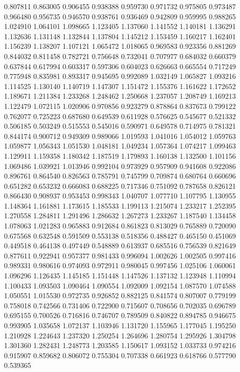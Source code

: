 0.807811
0.863005
0.906455
0.938388
0.959730
0.971732
0.975805
0.973487
0.966480
0.956735
0.946570
0.938761
0.936469
0.942809
0.959995
0.988265
1.024910
1.064101
1.098665
1.123405
1.137060
1.141552
1.140181
1.136291
1.132636
1.131148
1.132844
1.137804
1.145212
1.153459
1.160217
1.162401
1.156239
1.138207
1.107121
1.065472
1.018065
0.969583
0.923356
0.881269
0.844032
0.811458
0.782721
0.756648
0.732041
0.707977
0.684032
0.660379
0.637844
0.617994
0.603317
0.597306
0.604023
0.626663
0.665554
0.717249
0.775948
0.835981
0.893317
0.945695
0.992089
1.032149
1.065827
1.093216
1.114525
1.130140
1.140719
1.147307
1.151472
1.155376
1.161622
1.172652
1.189671
1.211384
1.233268
1.248462
1.250668
1.237057
1.208749
1.169213
1.122479
1.072115
1.020906
0.970856
0.923279
0.878864
0.837673
0.799122
0.762077
0.725223
0.687680
0.649539
0.611928
0.576625
0.545677
0.521332
0.506185
0.503249
0.515553
0.545016
0.590971
0.649578
0.714975
0.781321
0.844174
0.900712
0.949309
0.989066
1.019593
1.041016
1.054012
1.059763
1.059877
1.056343
1.051530
1.048181
1.049234
1.057364
1.074217
1.099463
1.129911
1.159358
1.180342
1.187519
1.179893
1.160138
1.132500
1.101156
1.069486
1.039921
1.013946
0.992104
0.973929
0.957909
0.941608
0.922086
0.896761
0.864540
0.826563
0.785791
0.745799
0.709874
0.680764
0.660696
0.651282
0.653232
0.666083
0.688225
0.717346
0.751092
0.787658
0.826121
0.866430
0.908937
0.953453
0.998343
1.040707
1.077710
1.107795
1.130955
1.148364
1.161881
1.173615
1.185533
1.199113
1.215074
1.233217
1.252395
1.270558
1.284811
1.291496
1.286632
1.267273
1.233267
1.187540
1.134458
1.078063
1.021283
0.965883
0.912684
0.861823
0.813029
0.765889
0.720090
0.675568
0.632548
0.591509
0.553138
0.518356
0.488427
0.465150
0.451069
0.449518
0.464138
0.497449
0.548889
0.613937
0.685516
0.756539
0.821649
0.877611
0.922941
0.957377
0.981433
0.996094
1.002626
1.002505
0.997416
0.989331
0.980616
0.974093
0.972911
0.980045
0.997456
1.025106
1.060061
1.096296
1.126435
1.145185
1.151448
1.147526
1.137132
1.123948
1.110994
1.100433
1.093503
1.090464
1.090554
1.092009
1.092154
1.087570
1.074588
1.050551
1.015530
0.972735
0.926852
0.882125
0.841574
0.807007
0.779199
0.758018
0.742566
0.731406
0.722900
0.715607
0.708656
0.702035
0.696789
0.695155
0.700526
0.716816
0.746707
0.789509
0.840822
0.894785
0.946675
0.993905
1.035658
1.072137
1.103946
1.131720
1.155965
1.177045
1.195250
1.210928
1.224643
1.237320
1.250254
1.264696
1.280754
1.295926
1.304798
1.301360
1.282431
1.248773
1.203585
1.150617
1.093152
1.033733
0.974216
0.915907
0.859682
0.806072
0.755304
0.707338
0.661923
0.618766
0.577790
0.539365
